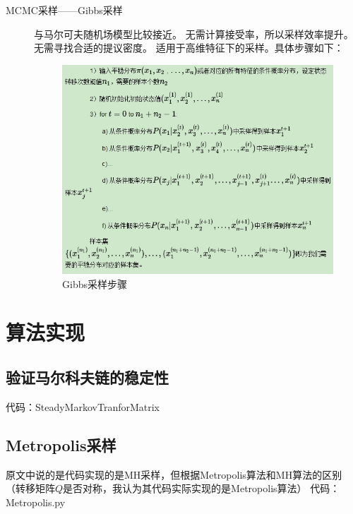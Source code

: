 \documentclass{ctexart}
\begin{document}
\begin{description}
\item[MCMC采样——Gibbs采样]
与马尔可夫随机场模型比较接近{\color{red}{为什么待补充}}。
无需计算接受率，所以采样效率提升。无需寻找合适的提议密度。
适用于高维特征下的采样。具体步骤如下：
\begin{figure}[H]
\begin{center}
\includegraphics[width=1\textwidth]{fig/gibbs.jpg} %
\caption{Gibbs采样步骤}
\end{center}
\end{figure}


\end{description}





\section{算法实现}
\subsection{验证马尔科夫链的稳定性}
代码：SteadyMarkovTranforMatrix

\subsection{Metropolis采样}
原文中说的是代码实现的是MH采样\cite{mcmc:Liu}，但根据Metropolis算法和MH算法的区别（转移矩阵$Q$是否对称，我认为其代码实际实现的是Metropolis算法）
代码：Metropolis.py
\end{document}
